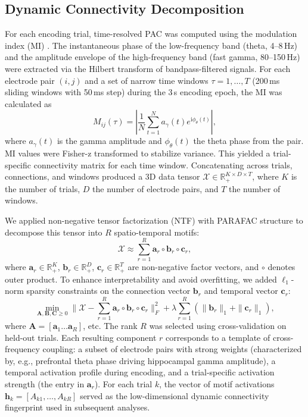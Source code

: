 \documentclass{article}
\begin{document}
\subsection{Dynamic Connectivity Decomposition}
For each encoding trial, time-resolved PAC was computed using the modulation index (MI) \cite{canolty2006high,tort2010measuring}. The instantaneous phase of the low-frequency band (theta, 4--8\,Hz) and the amplitude envelope of the high-frequency band (fast gamma, 80--150\,Hz) were extracted via the Hilbert transform of bandpass-filtered signals. For each electrode pair \((i,j)\) and a set of narrow time windows \(\tau = 1,\dots,T\) (200\,ms sliding windows with 50\,ms step) during the 3\,s encoding epoch, the MI was calculated as
\[
M_{i j}(\tau) = \left|\frac{1}{N}\sum_{t=1}^N a_\gamma(t) e^{\mathrm{i}\phi_\theta(t)}\right|,
\]
where \(a_\gamma(t)\) is the gamma amplitude and \(\phi_\theta(t)\) the theta phase from the pair. MI values were Fisher-z transformed to stabilize variance. This yielded a trial-specific connectivity matrix for each time window. Concatenating across trials, connections, and windows produced a 3D data tensor \(\mathcal{X} \in \mathbb{R}_+^{K \times D \times T}\), where \(K\) is the number of trials, \(D\) the number of electrode pairs, and \(T\) the number of windows.

We applied non-negative tensor factorization (NTF) with PARAFAC structure \cite{koch2020nonnegative,cilardo2018tensor} to decompose this tensor into \(R\) spatio-temporal motifs:
\[
\mathcal{X} \approx \sum_{r=1}^{R} \mathbf{a}_r \circ \mathbf{b}_r \circ \mathbf{c}_r,
\]
where \(\mathbf{a}_r \in \mathbb{R}_+^{K}\), \(\mathbf{b}_r \in \mathbb{R}_+^{D}\), \(\mathbf{c}_r \in \mathbb{R}_+^{T}\) are non-negative factor vectors, and \(\circ\) denotes outer product. To enhance interpretability and avoid overfitting, we added \(\ell_1\)-norm sparsity constraints on the connection vector \(\mathbf{b}_r\) and temporal vector \(\mathbf{c}_r\):
\[
\min_{\mathbf{A,B,C} \ge 0} \|\mathcal{X} - \sum_{r=1}^{R} \mathbf{a}_r \circ \mathbf{b}_r \circ \mathbf{c}_r\|_F^2 + \lambda \sum_{r=1}^{R} \left( \|\mathbf{b}_r\|_1 + \|\mathbf{c}_r\|_1 \right),
\]
where \(\mathbf{A}=[\mathbf{a}_1\dots\mathbf{a}_R]\), etc. The rank \(R\) was selected using cross-validation on held-out trials. Each resulting component \(r\) corresponds to a template of cross-frequency coupling: a subset of electrode pairs with strong weights (characterized by, e.g., prefrontal theta phase driving hippocampal gamma amplitude), a temporal activation profile during encoding, and a trial-specific activation strength (the entry in \(\mathbf{a}_r\)). For each trial \(k\), the vector of motif activations \(\mathbf{h}_k = [A_{k1}, \dots, A_{kR}]\) served as the low-dimensional dynamic connectivity fingerprint used in subsequent analyses.
\end{document}
